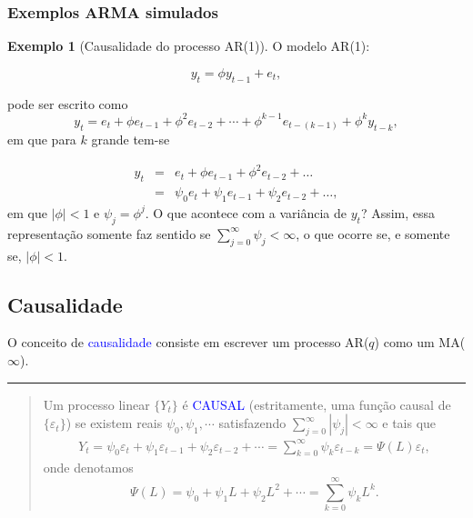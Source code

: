 \documentclass[
]{book}
\theoremstyle{definition}
\theoremstyle{definition}
\newtheorem{example}{Exemplo}[chapter]
\theoremstyle{definition}
\theoremstyle{remark}
\begin{document}
\hypertarget{exemplos-arma-simulados}{%
\subsubsection{Exemplos ARMA simulados}\label{exemplos-arma-simulados}}

\begin{example}[Causalidade do processo AR(1)]
\protect\hypertarget{exm:causar1}{}{\label{exm:causar1} {} }O modelo AR(1):

\[
y_t = \phi y_{t-1} + e_t,
\]

pode ser escrito como
\[
 y_t = e_t + \phi e_{t-1} + \phi^2 e_{t-2} + \cdots + \phi^{k-1}e_{t-(k-1)} + \phi^ky_{t-k},
\]
em que para \(k\) grande tem-se

\begin{eqnarray*}
y_t & = & e_t + \phi e_{t-1} + \phi^2 e_{t-2} + \ldots\\
   & = & \psi_0 e_t + \psi_1 e_{t-1} + \psi_2 e_{t-2} + \ldots,
\end{eqnarray*}
em que \(|\phi| < 1\) e \(\psi_j = \phi^j\). O que acontece com a variância de \(y_t\)? Assim, essa representação somente faz sentido se
\(\sum_{j=0}^{\infty}\psi_j<\infty\), o que ocorre se, e somente se, \(|\phi|<1\).
\end{example}

\hypertarget{causalidade}{%
\subsection{Causalidade}\label{causalidade}}

O conceito de \textcolor{blue}{ causalidade } consiste em escrever um processo AR(\(q\)) como um MA(\(\infty\)).

\begin{center}\rule{0.5\linewidth}{0.5pt}\end{center}

\begin{quote}
Um processo linear \(\{Y_t \}\) é \textcolor{blue}{ CAUSAL } (estritamente, uma função causal de \(\{\varepsilon_t \}\)) se existem reais \(\psi_0,\psi_1,\cdots\) satisfazendo \(\sum_{j=0}^{\infty}|\psi_j|<\infty\) e tais que
\begin{align}
Y_t = \psi_0\varepsilon_t + \psi_1\varepsilon_{t-1} + \psi_2 \varepsilon_{t-2} + \cdots = \sum_{k=0}^\infty\psi_k\varepsilon_{t-k}= \Psi(L)\varepsilon_t,
\label{eq:causaldef}
\end{align}
onde denotamos
\[
\Psi(L) = \psi_0 + \psi_1 L + \psi_2 L^2 + \cdots = \sum_{k=0}^\infty\psi_kL^k.
\]
\end{quote}
\end{document}
